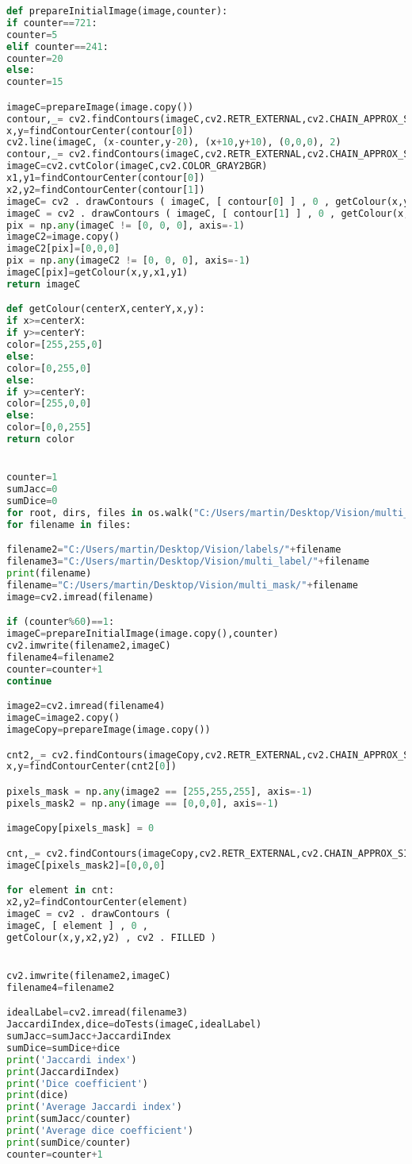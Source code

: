 \documentclass[12pt]{article}
\begin{document}
\begin{lstlisting}[language=Python]
def prepareInitialImage(image,counter):
if counter==721:
counter=5
elif counter==241:
counter=20
else:
counter=15

imageC=prepareImage(image.copy())
contour,_= cv2.findContours(imageC,cv2.RETR_EXTERNAL,cv2.CHAIN_APPROX_SIMPLE)
x,y=findContourCenter(contour[0])
cv2.line(imageC, (x-counter,y-20), (x+10,y+10), (0,0,0), 2)
contour,_= cv2.findContours(imageC,cv2.RETR_EXTERNAL,cv2.CHAIN_APPROX_SIMPLE)
imageC=cv2.cvtColor(imageC,cv2.COLOR_GRAY2BGR)
x1,y1=findContourCenter(contour[0])
x2,y2=findContourCenter(contour[1])
imageC= cv2 . drawContours ( imageC, [ contour[0] ] , 0 , getColour(x,y,x1,y1) , cv2 . FILLED )
imageC = cv2 . drawContours ( imageC, [ contour[1] ] , 0 , getColour(x,y,x2,y2) , cv2 . FILLED )
pix = np.any(imageC != [0, 0, 0], axis=-1)
imageC2=image.copy()
imageC2[pix]=[0,0,0]
pix = np.any(imageC2 != [0, 0, 0], axis=-1)
imageC[pix]=getColour(x,y,x1,y1)
return imageC

def getColour(centerX,centerY,x,y):
if x>=centerX:
if y>=centerY:
color=[255,255,0]
else:
color=[0,255,0]
else:
if y>=centerY:
color=[255,0,0]
else:
color=[0,0,255]
return color


counter=1
sumJacc=0
sumDice=0
for root, dirs, files in os.walk("C:/Users/martin/Desktop/Vision/multi_mask"):
for filename in files:

filename2="C:/Users/martin/Desktop/Vision/labels/"+filename
filename3="C:/Users/martin/Desktop/Vision/multi_label/"+filename
print(filename)
filename="C:/Users/martin/Desktop/Vision/multi_mask/"+filename
image=cv2.imread(filename)

if (counter%60)==1:
imageC=prepareInitialImage(image.copy(),counter)
cv2.imwrite(filename2,imageC)
filename4=filename2
counter=counter+1
continue

image2=cv2.imread(filename4)
imageC=image2.copy()
imageCopy=prepareImage(image.copy())

cnt2,_= cv2.findContours(imageCopy,cv2.RETR_EXTERNAL,cv2.CHAIN_APPROX_SIMPLE)
x,y=findContourCenter(cnt2[0])

pixels_mask = np.any(image2 == [255,255,255], axis=-1)
pixels_mask2 = np.any(image == [0,0,0], axis=-1)

imageCopy[pixels_mask] = 0

cnt,_= cv2.findContours(imageCopy,cv2.RETR_EXTERNAL,cv2.CHAIN_APPROX_SIMPLE)
imageC[pixels_mask2]=[0,0,0]

for element in cnt:
x2,y2=findContourCenter(element)
imageC = cv2 . drawContours ( 
imageC, [ element ] , 0 ,
getColour(x,y,x2,y2) , cv2 . FILLED )


cv2.imwrite(filename2,imageC)
filename4=filename2

idealLabel=cv2.imread(filename3)
JaccardiIndex,dice=doTests(imageC,idealLabel)
sumJacc=sumJacc+JaccardiIndex
sumDice=sumDice+dice
print('Jaccardi index')
print(JaccardiIndex)
print('Dice coefficient')
print(dice)
print('Average Jaccardi index')
print(sumJacc/counter)
print('Average dice coefficient')
print(sumDice/counter)
counter=counter+1
\end{lstlisting}
\end{document}
